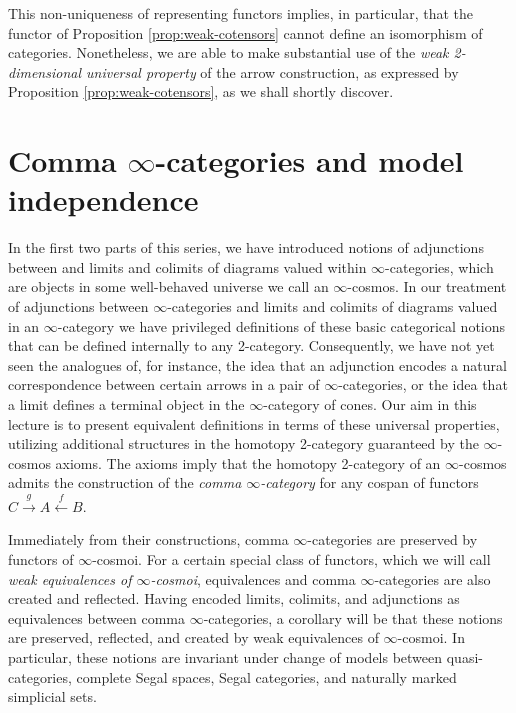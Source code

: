 \documentclass[12pt,reqno]{amsart}
\theoremstyle{plain}
\theoremstyle{definition}
\theoremstyle{remark}
\numberwithin{equation}{subsection}
\begin{document}
This non-uniqueness of representing functors implies, in particular, that the functor of Proposition \ref{prop:weak-cotensors} cannot define an isomorphism of categories. Nonetheless, we are able to make substantial  use of the \emph{weak 2-dimensional universal property} of the arrow construction, as expressed by Proposition \ref{prop:weak-cotensors}, as we shall shortly discover.

\renewcommand\thesection{Lecture~\arabic{section}}
\section{Comma \texorpdfstring{$\infty$}{infinity}-categories and model independence}\label{sec:comma}
\renewcommand\thesection{\arabic{section}}


In the first two parts of this series, we have introduced notions of adjunctions between and limits and colimits of diagrams valued within $\infty$-categories, which are objects in some well-behaved universe we call an $\infty$-cosmos. In our treatment of adjunctions between $\infty$-categories and limits and colimits of diagrams valued in an $\infty$-category we have privileged definitions of these basic categorical notions that can be defined internally to any 2-category. Consequently, we have not yet seen the analogues of, for instance, the idea that an adjunction encodes a natural correspondence between certain arrows in a pair of $\infty$-categories, or the idea that a limit defines a terminal object in the $\infty$-category of cones. Our aim in this lecture is to present equivalent definitions in terms of these universal properties, utilizing additional structures in the homotopy 2-category guaranteed by  the $\infty$-cosmos axioms. The axioms imply that the homotopy 2-category of an $\infty$-cosmos admits the construction of the \emph{comma $\infty$-category} for any cospan of functors $C \xrightarrow{g} A \xleftarrow{f} B$. 

Immediately from their constructions, comma $\infty$-categories are preserved by functors of $\infty$-cosmoi. For a certain special class of functors, which we will call \emph{weak equivalences of $\infty$-cosmoi}, equivalences and comma $\infty$-categories are also created and reflected. Having encoded limits, colimits, and adjunctions as equivalences between comma $\infty$-categories, a corollary will be that these notions are preserved, reflected, and created by weak equivalences of $\infty$-cosmoi. In particular, these notions are invariant under change of models between quasi-categories, complete Segal spaces, Segal categories, and naturally marked simplicial sets.
\end{document}
